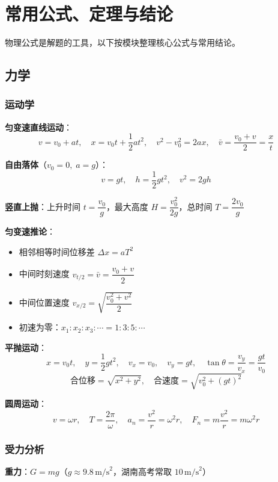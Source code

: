 \section{常用公式、定理与结论}

物理公式是解题的工具，以下按模块整理核心公式与常用结论。

\subsection{力学}

\subsubsection{运动学}

\textbf{匀变速直线运动}：
\[
v = v_0 + at,\quad
x = v_0t + \frac12 at^2,\quad
v^2 - v_0^2 = 2ax,\quad
\bar{v} = \frac{v_0+v}{2} = \frac{x}{t}
\]

\textbf{自由落体}（$v_0=0,\;a=g$）：
\[
v = gt,\quad h = \frac12 gt^2,\quad v^2 = 2gh
\]

\textbf{竖直上抛}：上升时间 $t = \dfrac{v_0}{g}$，最大高度 $H = \dfrac{v_0^2}{2g}$，总时间 $T = \dfrac{2v_0}{g}$

\textbf{匀变速推论}：
\begin{itemize}
  \item 相邻相等时间位移差 $\Delta x = aT^2$
  \item 中间时刻速度 $v_{t/2} = \bar{v} = \dfrac{v_0+v}{2}$
  \item 中间位置速度 $v_{x/2} = \sqrt{\dfrac{v_0^2+v^2}{2}}$
  \item 初速为零：$x_1:x_2:x_3:\cdots = 1:3:5:\cdots$
\end{itemize}

\textbf{平抛运动}：
\[
x = v_0t,\quad y = \frac12 gt^2,\quad
v_x = v_0,\quad v_y = gt,\quad
\tan\theta = \frac{v_y}{v_x} = \frac{gt}{v_0}
\]
\[
\text{合位移} = \sqrt{x^2+y^2},\quad
\text{合速度} = \sqrt{v_0^2+(gt)^2}
\]

\textbf{圆周运动}：
\[
v = \omega r,\quad
T = \frac{2\pi}{\omega},\quad
a_n = \frac{v^2}{r} = \omega^2 r,\quad
F_n = m\frac{v^2}{r} = m\omega^2 r
\]

\subsubsection{受力分析}

\textbf{重力}：$G = mg$（$g\approx 9.8\,\text{m/s}^2$，湖南高考常取 $10\,\text{m/s}^2$）

